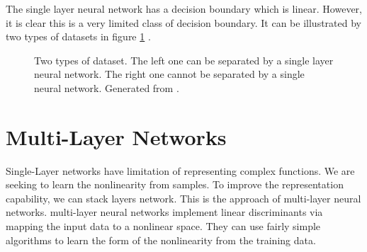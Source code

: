 The single layer neural network has a decision boundary which is linear. However, it is clear this is a very limited class of decision boundary. It can be illustrated by two types of datasets in figure \ref{fig:1Layer2datasets} .
\graphicspath{ {./Figures/} }
\begin{figure}[!htb]
\centering     %
{}
\caption{\label{fig:1Layer2datasets}Two types of dataset. The left one can be separated by a single layer neural network. The right one cannot be separated by a single neural network. Generated from \citep{GenerateNN}.}
\end{figure}

\section{Multi-Layer Networks}

Single-Layer networks have limitation of representing complex functions. We are seeking to learn the nonlinearity from samples. To improve the representation capability, we can stack layers network. This is the approach of multi-layer neural networks. multi-layer neural networks implement linear discriminants via mapping the input data to a nonlinear space. They can use fairly simple algorithms to learn the form of the nonlinearity from the training data.

